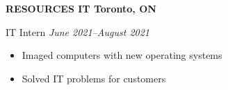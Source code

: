 \textbf{RESOURCES IT \hfill Toronto, ON}\par

IT Intern \hfill \textit{June 2021--August 2021}
\begin{itemize}
        \item Imaged computers with new operating systems
        \item Solved IT problems for customers
\end{itemize}\par
